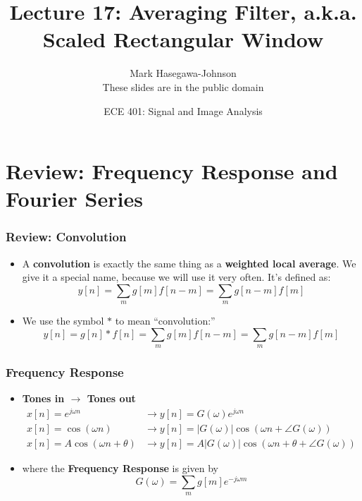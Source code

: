 \documentclass{beamer}
\title{Lecture 17: Averaging Filter, a.k.a. Scaled Rectangular Window}
\author{Mark Hasegawa-Johnson\\These slides are in the public domain}
\date{ECE 401: Signal and Image Analysis}
\begin{document}
\begin{frame}
  \maketitle
\end{frame}

\begin{frame}
  \tableofcontents
\end{frame}

\section[Review]{Review: Frequency Response and Fourier Series}
\setcounter{subsection}{1}

\begin{frame}
  \frametitle{Review: Convolution}
  \begin{itemize}
  \item A {\bf convolution} is exactly the same thing as a {\bf weighted local average}.
    We give it a special name, because we will use it very often.  It's defined as:
    \[
    y[n] = \sum_m g[m] f[n-m] = \sum_m g[n-m] f[m]
    \]
  \item 
    We use the symbol $\ast$ to mean ``convolution:''
    \[
    y[n]=g[n]\ast f[n] = \sum_m g[m] f[n-m] = \sum_m g[n-m] f[m]
    \]
  \end{itemize}
\end{frame}

\begin{frame}
  \frametitle{Frequency Response}
  \begin{itemize}
  \item {\bf Tones in $\rightarrow$ Tones out}
    \begin{align*}
      x[n]=e^{j\omega n} &\rightarrow y[n]=G(\omega)e^{j\omega n}\\
      x[n]=\cos\left(\omega n\right)
      &\rightarrow y[n]=|G(\omega)|\cos\left(\omega n+\angle G(\omega)\right)\\
      x[n]=A\cos\left(\omega n+\theta\right)
      &\rightarrow y[n]=A|G(\omega)|\cos\left(\omega n+\theta+\angle G(\omega)\right)
    \end{align*}
  \item where the {\bf Frequency Response} is given by
    \[
    G(\omega) = \sum_m g[m]e^{-j\omega m}
    \]
  \end{itemize}
\end{frame}
\end{document}
